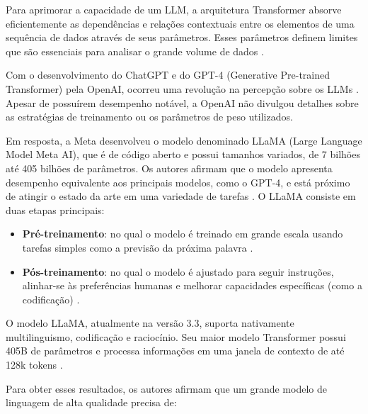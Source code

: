 Para aprimorar a capacidade de um LLM, a arquitetura Transformer absorve eficientemente as dependências e relações contextuais entre os elementos de uma sequência de dados através de seus parâmetros. Esses parâmetros definem limites que são essenciais para analisar o grande volume de dados \cite{naveed2024}.

Com o desenvolvimento do ChatGPT e do GPT-4 (Generative Pre-trained Transformer) pela OpenAI, ocorreu uma revolução na percepção sobre os LLMs \cite{openai2024}. Apesar de possuírem desempenho notável, a OpenAI não divulgou detalhes sobre as estratégias de treinamento ou os parâmetros de peso utilizados.

Em resposta, a Meta desenvolveu o modelo denominado LLaMA (Large Language Model Meta AI), que é de código aberto e possui tamanhos variados, de 7 bilhões até 405 bilhões de parâmetros. Os autores afirmam que o modelo apresenta desempenho equivalente aos principais modelos, como o GPT-4, e está próximo de atingir o estado da arte em uma variedade de tarefas \cite{touvron2023}. O LLaMA consiste em duas etapas principais:

\begin{itemize}
    \item \textbf{Pré-treinamento}: no qual o modelo é treinado em grande escala usando tarefas simples como a previsão da próxima palavra \cite{llama3}.
    \item \textbf{Pós-treinamento}: no qual o modelo é ajustado para seguir instruções, alinhar-se às preferências humanas e melhorar capacidades específicas (como a codificação) \cite{llama3}.
\end{itemize}

O modelo LLaMA, atualmente na versão 3.3, suporta nativamente multilinguismo, codificação e raciocínio. Seu maior modelo Transformer possui 405B de parâmetros e processa informações em uma janela de contexto de até 128k tokens \cite{llama3}.

Para obter esses resultados, os autores afirmam que um grande modelo de linguagem de alta qualidade precisa de:

